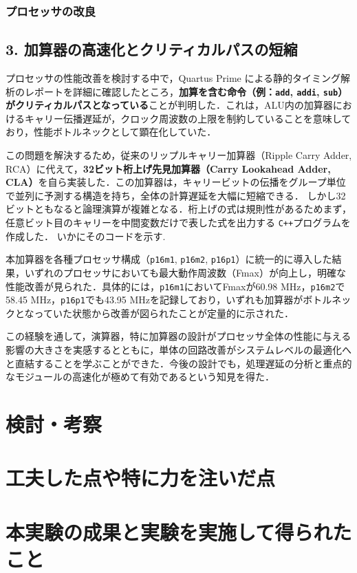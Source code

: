 \documentclass[autodetect-engine,dvi=dvipdfmx,ja=standard,
               a4j,11pt]{bxjsarticle}
\begin{document}
\subsubsection{プロセッサの改良}
\subsection*{3. 加算器の高速化とクリティカルパスの短縮}

プロセッサの性能改善を検討する中で，Quartus Prime による静的タイミング解析のレポートを詳細に確認したところ，\textbf{加算を含む命令（例：\texttt{add}, \texttt{addi}, \texttt{sub}）がクリティカルパスとなっている}ことが判明した．これは，ALU内の加算器におけるキャリー伝播遅延が，クロック周波数の上限を制約していることを意味しており，性能ボトルネックとして顕在化していた．

この問題を解決するため，従来のリップルキャリー加算器（Ripple Carry Adder, RCA）に代えて，\textbf{32ビット桁上げ先見加算器（Carry Lookahead Adder, CLA）}を自ら実装した．この加算器は，キャリービットの伝播をグループ単位で並列に予測する構造を持ち，全体の計算遅延を大幅に短縮できる．
しかし32ビットともなると論理演算が複雑となる．桁上げの式は規則性があるためまず，任意ビット目のキャリーを中間変数だけで表した式を出力する
\verb|C++|プログラムを作成した．
いかにそのコードを示す.


本加算器を各種プロセッサ構成（\texttt{p16m1}, \texttt{p16m2}, \texttt{p16p1}）に統一的に導入した結果，いずれのプロセッサにおいても最大動作周波数（Fmax）が向上し，明確な性能改善が見られた．具体的には，\texttt{p16m1}においてFmaxが60.98 MHz，\texttt{p16m2}で58.45 MHz，\texttt{p16p1}でも43.95 MHzを記録しており，いずれも加算器がボトルネックとなっていた状態から改善が図られたことが定量的に示された．

この経験を通して，演算器，特に加算器の設計がプロセッサ全体の性能に与える影響の大きさを実感するとともに，単体の回路改善がシステムレベルの最適化へと直結することを学ぶことができた．今後の設計でも，処理遅延の分析と重点的なモジュールの高速化が極めて有効であるという知見を得た．



\section{検討・考察}
\section{工夫した点や特に力を注いだ点}
\section{本実験の成果と実験を実施して得られたこと}
\end{document}
